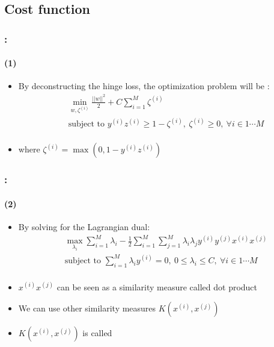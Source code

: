 \documentclass[xcolor=table]{beamer}
\begin{document}
\subsection{Cost function}

\begin{frame}
	\frametitle{\insertshortsubtitle: \insertsection}
	\framesubtitle{\insertsubsection (1)}
	
	\begin{itemize}
		\item By deconstructing the hinge loss, the optimization problem will be :
		\begin{align*}
			& \min_{w, \zeta^{(i)}} \frac{||w||^2}{2} +  C \sum_{i=1}^{M} \zeta^{(i)} \\
			& \text{subject to } y^{(i)} z^{(i)} \ge 1 - \zeta^{(i)},\ \zeta^{(i)} \ge 0,\ \forall i \in {1 \cdots M} \\
		\end{align*}
		\item where $ \zeta^{(i)} = \max (0, 1 - y^{(i)} z^{(i)}) $
	\end{itemize}

\end{frame}

\begin{frame}
	\frametitle{\insertshortsubtitle: \insertsection}
	\framesubtitle{\insertsubsection (2)}
	
	\begin{itemize}
		\item By solving for the Lagrangian dual:
		\begin{align*}
			& \max_{\lambda_i}  \sum\limits_{i=1}^{M} \lambda_i - \frac{1}{2} \sum\limits_{i=1}^{M} \sum\limits_{j=1}^{M} \lambda_i \lambda_j y^{(i)} y^{(j)} x^{(i)} x^{(j)} \\
			& \text{subject to } \sum\limits_{i=1}^{M} \lambda_i y^{(i)} = 0,\ 0 \le \lambda_i \le C,\ \forall i \in {1 \cdots M} \\
		\end{align*}
		\item $ x^{(i)} x^{(j)} $ can be seen as a similarity measure called dot product
		\item We can use other similarity measures $ K(x^{(i)}, x^{(j)}) $ 
		\item $ K(x^{(i)}, x^{(j)}) $ is called 
	\end{itemize}
	
\end{frame}
\end{document}
